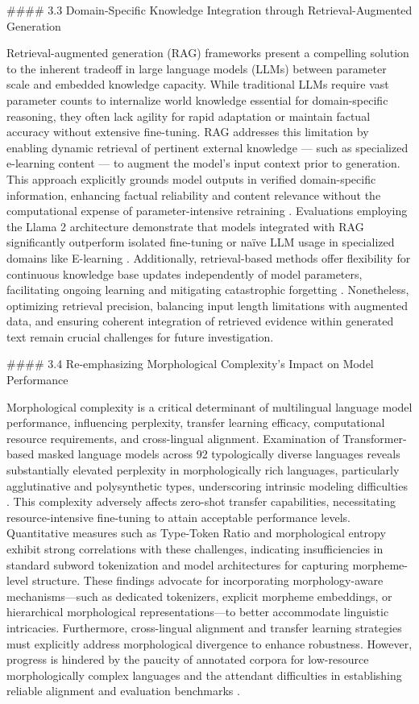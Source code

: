 \documentclass[11pt]{article}
\begin{document}
#### 3.3 Domain-Specific Knowledge Integration through Retrieval-Augmented Generation

Retrieval-augmented generation (RAG) frameworks present a compelling solution to the inherent tradeoff in large language models (LLMs) between parameter scale and embedded knowledge capacity. While traditional LLMs require vast parameter counts to internalize world knowledge essential for domain-specific reasoning, they often lack agility for rapid adaptation or maintain factual accuracy without extensive fine-tuning. RAG addresses this limitation by enabling dynamic retrieval of pertinent external knowledge — such as specialized e-learning content — to augment the model’s input context prior to generation. This approach explicitly grounds model outputs in verified domain-specific information, enhancing factual reliability and content relevance without the computational expense of parameter-intensive retraining \cite{ref8}. Evaluations employing the Llama 2 architecture demonstrate that models integrated with RAG significantly outperform isolated fine-tuning or naïve LLM usage in specialized domains like E-learning \cite{ref49}. Additionally, retrieval-based methods offer flexibility for continuous knowledge base updates independently of model parameters, facilitating ongoing learning and mitigating catastrophic forgetting \cite{ref49}. Nonetheless, optimizing retrieval precision, balancing input length limitations with augmented data, and ensuring coherent integration of retrieved evidence within generated text remain crucial challenges for future investigation.

#### 3.4 Re-emphasizing Morphological Complexity’s Impact on Model Performance

Morphological complexity is a critical determinant of multilingual language model performance, influencing perplexity, transfer learning efficacy, computational resource requirements, and cross-lingual alignment. Examination of Transformer-based masked language models across 92 typologically diverse languages reveals substantially elevated perplexity in morphologically rich languages, particularly agglutinative and polysynthetic types, underscoring intrinsic modeling difficulties \cite{ref34}. This complexity adversely affects zero-shot transfer capabilities, necessitating resource-intensive fine-tuning to attain acceptable performance levels. Quantitative measures such as Type-Token Ratio and morphological entropy exhibit strong correlations with these challenges, indicating insufficiencies in standard subword tokenization and model architectures for capturing morpheme-level structure. These findings advocate for incorporating morphology-aware mechanisms—such as dedicated tokenizers, explicit morpheme embeddings, or hierarchical morphological representations—to better accommodate linguistic intricacies. Furthermore, cross-lingual alignment and transfer learning strategies must explicitly address morphological divergence to enhance robustness. However, progress is hindered by the paucity of annotated corpora for low-resource morphologically complex languages and the attendant difficulties in establishing reliable alignment and evaluation benchmarks \cite{ref34}.
\end{document}
